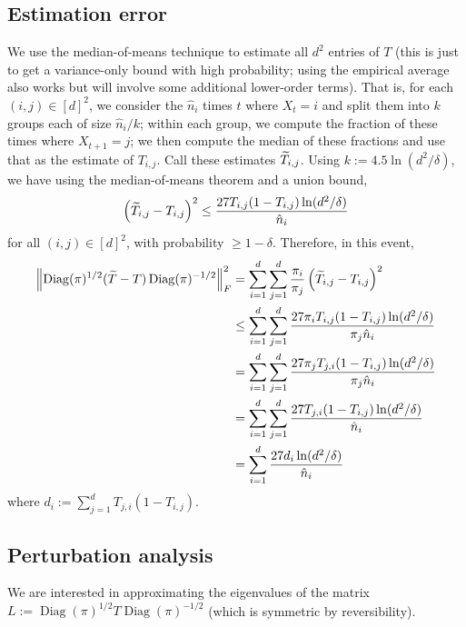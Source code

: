 \documentclass[11pt]{article}
\theoremstyle{plain}
\theoremstyle{definition}
\theoremstyle{remark}
\newcommand\wt{\ensuremath{\widetilde}}
\newcommand\norm[1]{\left\| #1 \right\|}
\newcommand\Parens[1]{\left( #1 \right)}
\DeclareMathOperator{\Diag}{Diag}
\begin{document}
\subsection{Estimation error}

We use the median-of-means technique to estimate all $d^2$ entries of
$T$ (this is just to get a variance-only bound with high probability;
using the empirical average also works but will involve some
additional lower-order terms).
That is, for each $(i,j)\in[d]^2$, we consider the $\hat{n}_i$
times $t$ where $X_t = i$ and split them into $k$ groups each of size
$\hat{n}_i/k$; within each group, we compute the fraction of these
times where $X_{t+1}=j$; we then compute the median of these fractions
and use that as the estimate of $T_{i,j}$.
Call these estimates $\wt{T}_{i,j}$.
Using $k := 4.5\ln(d^2/\delta)$, we have using the median-of-means
theorem and a union bound,
\[
  \Parens{ \wt{T}_{i,j} - T_{i,j} }^2
  \leq \frac{27T_{i,j}(1-T_{i,j})\ln(d^2/\delta)}{\hat{n}_i}
\]
for all $(i,j) \in [d]^2$, with probability $\geq1-\delta$.
Therefore, in this event,
\begin{align*}
  \norm{\Diag(\pi)^{1/2} (\wt{T} - T) \Diag(\pi)^{-1/2}}_F^2
  & = \sum_{i=1}^d \sum_{j=1}^d \frac{\pi_i}{\pi_j}
  \Parens{ \wt{T}_{i,j} - T_{i,j} }^2 \\
  & \leq \sum_{i=1}^d \sum_{j=1}^d
  \frac{27\pi_i T_{i,j} (1 - T_{i,j})\ln(d^2/\delta)}{\pi_j\hat{n}_i} \\
  & = \sum_{i=1}^d \sum_{j=1}^d
  \frac{27\pi_j T_{j,i} (1 - T_{i,j})\ln(d^2/\delta)}{\pi_j\hat{n}_i} \\
  & = \sum_{i=1}^d \sum_{j=1}^d
  \frac{27T_{j,i} (1 - T_{i,j})\ln(d^2/\delta)}{\hat{n}_i} \\
  & = \sum_{i=1}^d \frac{27d_i\ln(d^2/\delta)}{\hat{n}_i}
\end{align*}
where $d_i := \sum_{j=1}^d T_{j,i} (1 - T_{i,j})$.

\subsection{Perturbation analysis}

We are interested in approximating the eigenvalues of the matrix $L :=
\Diag(\pi)^{1/2} T \Diag(\pi)^{-1/2}$ (which is symmetric by
reversibility).
\end{document}
